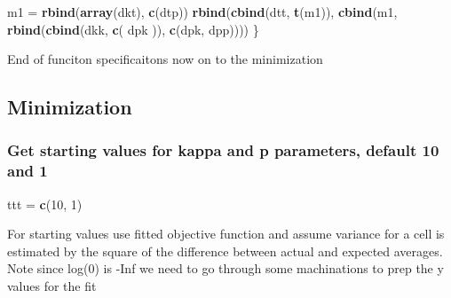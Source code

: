 \documentclass[]{article}
\newenvironment{Shaded}{\begin{snugshade}}{\end{snugshade}}
\newcommand{\DecValTok}[1]{\textcolor[rgb]{0.00,0.00,0.81}{#1}}
\newcommand{\KeywordTok}[1]{\textcolor[rgb]{0.13,0.29,0.53}{\textbf{#1}}}
\newcommand{\NormalTok}[1]{#1}
\newcommand{\StringTok}[1]{\textcolor[rgb]{0.31,0.60,0.02}{#1}}
\begin{document}
\begin{Shaded}
\begin{Highlighting}[]
\NormalTok{  m1 =}\StringTok{ }\KeywordTok{rbind}\NormalTok{(}\KeywordTok{array}\NormalTok{(dkt), }\KeywordTok{c}\NormalTok{(dtp))}
  \KeywordTok{rbind}\NormalTok{(}\KeywordTok{cbind}\NormalTok{(dtt, }\KeywordTok{t}\NormalTok{(m1)), }\KeywordTok{cbind}\NormalTok{(m1, }\KeywordTok{rbind}\NormalTok{(}\KeywordTok{cbind}\NormalTok{(dkk, }\KeywordTok{c}\NormalTok{(}
\NormalTok{    dpk}
\NormalTok{  )), }\KeywordTok{c}\NormalTok{(dpk, dpp))))}
\NormalTok{\}}
\end{Highlighting}
\end{Shaded}

End of funciton specificaitons now on to the minimization

\hypertarget{minimization}{%
\subsection{Minimization}\label{minimization}}

\hypertarget{get-starting-values-for-kappa-and-p-parameters-default-10-and-1}{%
\subsubsection{Get starting values for kappa and p parameters, default
10 and
1}\label{get-starting-values-for-kappa-and-p-parameters-default-10-and-1}}

\begin{Shaded}
\begin{Highlighting}[]
\NormalTok{ttt =}\StringTok{ }\KeywordTok{c}\NormalTok{(}\DecValTok{10}\NormalTok{, }\DecValTok{1}\NormalTok{)}
\end{Highlighting}
\end{Shaded}

For starting values use fitted objective function and assume variance
for a cell is estimated by the square of the difference between actual
and expected averages. Note since log(0) is -Inf we need to go through
some machinations to prep the y values for the fit
\end{document}
